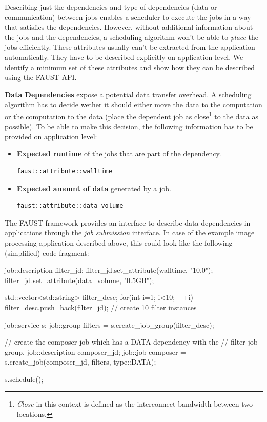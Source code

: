 Describing just the dependencies and type of dependencies (data or communication) between jobs enables a scheduler to execute the 
jobs in a way that satisfies the dependencies. However, without additional information about the jobs and the dependencies, a scheduling algorithm won't be able to \textit{place} the jobs efficiently. These attributes usually can't be extracted from the application automatically. They have to be described explicitly on application level. We identify a minimum set of these attributes and show how they can be described using the FAUST API.

\textbf{Data Dependencies} expose a potential data transfer overhead. A scheduling algorithm has to decide wether it should either move the data to the computation or the computation to the data (place the dependent job as close\footnote{\textit{Close} in this context is defined as the interconnect bandwidth between two locations.} to the data as possible). To be able to make this decision, the following information has to be provided on application level:

\begin{itemize}
\item \textbf{Expected runtime} of the jobs that are part of the dependency. \begin{verbatim}faust::attribute::walltime\end{verbatim}
\item \textbf{Expected amount of data} generated by a job.
\begin{verbatim}faust::attribute::data_volume\end{verbatim}
\end{itemize}

The FAUST framework provides an interface to describe data dependencies in applications through the \textit{job submission} interface. In case of the example image processing application described above, this could look like the following (simplified) code fragment:

 \begin{mycode}[label=Describing Data Dependencies]
 
    job::description filter_jd;
    filter_jd.set_attribute(walltime, "10.0");
    filter_jd.set_attribute(data_volume, "0.5GB");
    
    std::vector<std::string> filter_desc;
    for(int i=1; i<10; ++i)
      filter_desc.push_back(filter_jd); // create 10 filter instances
    
    job::service s;
    job::group filters = s.create_job_group(filter_desc);

    // create the composer job which has a DATA dependency with the
    // filter job group. 
    job::description composer_jd;
    job::job composer = s.create_job(composer_jd, filters, type::DATA);
    
    s.schedule();
  
 \end{mycode}

